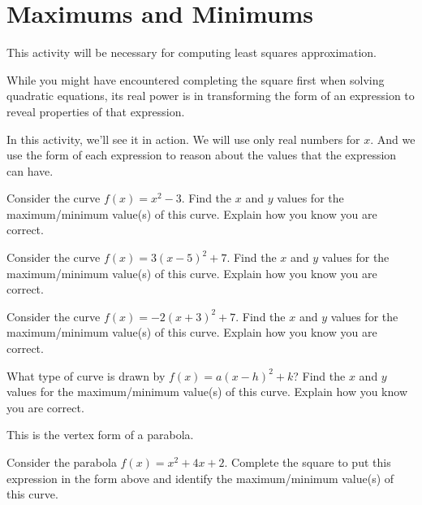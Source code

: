 \newpage
\section{Maximums and Minimums}\label{A:vertex}

\begin{teachingnote}
This activity will be necessary for computing least squares
approximation.
\end{teachingnote}


While you might have encountered completing the
square first when solving quadratic
equations, its real power is in transforming the form of an
expression to reveal properties of that expression. 

In this activity, we'll see it in action.  We will use only real numbers for $x$.  And we use the form of each expression to reason about the values that the expression can have.  

\begin{prob}
Consider the curve $f(x) = x^2 -3$. Find the $x$ and $y$ values for
the maximum/minimum value(s) of this curve. Explain how you know you
are correct.
\end{prob}

\begin{prob}
Consider the curve $f(x) = 3(x-5)^2 +7$. Find the $x$ and $y$ values for
the maximum/minimum value(s) of this curve. Explain how you know you
are correct.
\end{prob}



\begin{prob}
Consider the curve $f(x) = -2(x+3)^2 + 7$. Find the $x$ and $y$ values for
the maximum/minimum value(s) of this curve. Explain how you know you
are correct.
\end{prob}

\begin{prob}
What type of curve is drawn by $f(x) = a(x-h)^2+k$? Find the $x$ and
$y$ values for the maximum/minimum value(s) of this curve. Explain how
you know you are correct.
\end{prob}

\begin{teachingnote}
This is the vertex form of a parabola.
\end{teachingnote}


\begin{prob}
Consider the parabola $f(x) = x^2 + 4x + 2$. Complete the square to
put this expression in the form above and identify the maximum/minimum
value(s) of this curve.
\end{prob}


